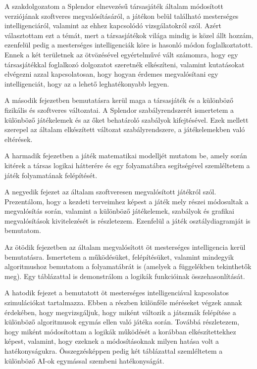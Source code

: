
A szakdolgozatom a Splendor elnevezésű társasjáték általam módosított verziójának szoftveres megvalósításáról, a játékon belül található mesterséges intelligenciáról, valamint az ehhez kapcsolódó vizsgálatokról szól. Azért választottam ezt a témát, mert a társasjátékok világa mindig is közel állt hozzám, ezenfelül pedig a mesterséges intelligenciák köre is hasonló módon foglalkoztatott. Ennek a két területnek az ötvözésével egyértelművé vált számomra, hogy egy társasjátékkal foglalkozó dolgozatot szeretnék elkészíteni, valamint kutatásokat elvégezni azzal kapcsolatosan, hogy hogyan érdemes megvalósítani egy intelligenciát, hogy az a lehető leghatékonyabb legyen.

A második fejezetben bemutatásra kerül maga a társasjáték és a különböző fizikális és szoftveres változatai. A Splendor szabályrendszerét ismertetem a különböző játékelemek és az őket behatároló szabályok kifejtésével. Ezek mellett szerepel az általam elkészített változat szabályrendszere, a játékelemekben való eltérések.

A harmadik fejezetben a játék matematikai modelljét mutatom be, amely során kitérek a társas logikai hátterére és egy folyamatábra segítségével szemléltetem a játék folyamatának felépítését.

A negyedik fejezet az általam szoftveresen megvalósított játékról szól. Prezentálom, hogy a kezdeti terveimhez képest a játék mely részei módosultak a megvalósítás során, valamint a különböző játékelemek, szabályok és grafikai megvalósítások kivitelezését is részletezem. Ezenfelül a játék osztálydiagramját is bemutatom.

Az ötödik fejezetben az általam megvalósított öt mesterséges intelligencia kerül bemutatásra. Ismertetem a működésüket, felépítésüket, valamint mindegyik algoritmushoz bemutatom a folyamatábrát is (amelyek a függelékben tekinthetők meg). Egy táblázattal is demonstrálom a logikák funkcióinak összehasonlítását.

A hatodik fejezet a bemutatott öt mesterséges intelligenciával kapcsolatos szimulációkat tartalmazza. Ebben a részben különféle méréseket végzek annak érdekében, hogy megvizsgáljuk, hogy miként változik a játszmák felépítése a különböző algoritmusok egymás ellen való játéka során. Továbbá részletezem, hogy miként módosítottam a logikák működését a korábban elkészítettekhez képest, valamint, hogy ezeknek a módosításoknak milyen hatása volt a hatékonyságukra. Összegzésképpen pedig két táblázattal szemléltetem a különböző AI-ok egymással szembeni hatékonyságát.